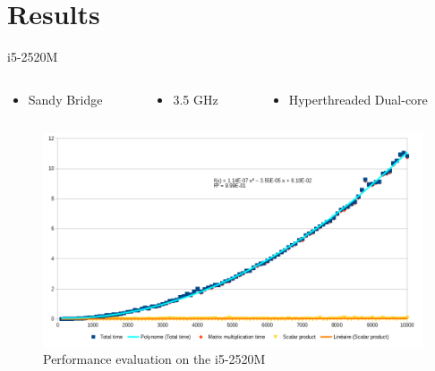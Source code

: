 \documentclass{beamer}
\begin{document}
\section{Results}
\begin{frame}{i5-2520M}
\begin{columns}
\begin{column}{0.3\linewidth}
\begin{itemize}
\item Sandy Bridge
\end{itemize}
\end{column}
\begin{column}{0.3\linewidth}
\begin{itemize}
\item 3.5 GHz
\end{itemize}
\end{column}
\begin{column}{0.3\linewidth}
\begin{itemize}
\item Hyperthreaded Dual-core
\end{itemize}
\end{column}
\end{columns}
\begin{figure}
\includegraphics[width=0.82\linewidth]{lenovo-i5-2emeGen.png}
\caption{Performance evaluation on the i5-2520M}
\end{figure}
\end{frame}
\end{document}
